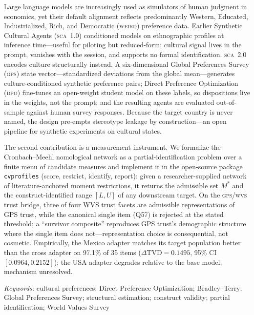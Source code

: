 \documentclass[11pt,letterpaper]{article}
\newcommand{\GPS}{\textsc{gps}}
\newcommand{\WVS}{\textsc{wvs}}
\newcommand{\DPO}{\textsc{dpo}}
\newcommand{\SCA}{\textsc{sca}}
\newcommand{\WEIRD}{\textsc{weird}}
\newcommand{\cvp}{\texttt{cvprofiles}}
\begin{document}
Large language models are increasingly used as simulators of human judgment in economics, yet their default alignment reflects predominantly Western, Educated, Industrialized, Rich, and Democratic (\WEIRD{}) preference data. Earlier Synthetic Cultural Agents (\SCA{}~1.0) conditioned models on ethnographic profiles at inference time---useful for piloting but reduced-form: cultural signal lives in the prompt, vanishes with the session, and supports no formal identification. \SCA{}~2.0 encodes culture structurally instead. A six-dimensional Global Preferences Survey (\GPS{}) state vector---standardized deviations from the global mean---generates culture-conditioned synthetic preference pairs; Direct Preference Optimization (\DPO{}) fine-tunes an open-weight student model on these labels, so dispositions live in the weights, not the prompt; and the resulting agents are evaluated out-of-sample against human survey responses. Because the target country is never named, the design pre-empts stereotype leakage by construction---an open pipeline for synthetic experiments on cultural states.

The second contribution is a measurement instrument. We formalize the Cronbach--Meehl nomological network as a partial-identification problem over a finite menu of candidate measures and implement it in the open-source package \cvp{} (score, restrict, identify, report): given a researcher-supplied network of literature-anchored moment restrictions, it returns the admissible set $M^*$ and the construct-identified range $[L,U]$ of any downstream target. On the \GPS{}/\WVS{} trust bridge, three of four WVS trust facets are admissible representations of GPS trust, while the canonical single item (Q57) is rejected at the stated threshold; a ``survivor composite'' reproduces GPS trust's demographic structure where the single item does not---representation choice is consequential, not cosmetic. Empirically, the Mexico adapter matches its target population better than the cross adapter on 97.1\% of 35 items ($\Delta\text{TVD}=0.1495$, 95\% CI $[0.0964, 0.2152]$); the USA adapter degrades relative to the base model, mechanism unresolved.

\vspace{0.4em}
\noindent\textit{Keywords:} cultural preferences; Direct Preference Optimization; Bradley--Terry; Global Preferences Survey; structural estimation; construct validity; partial identification; World Values Survey

\end{document}
